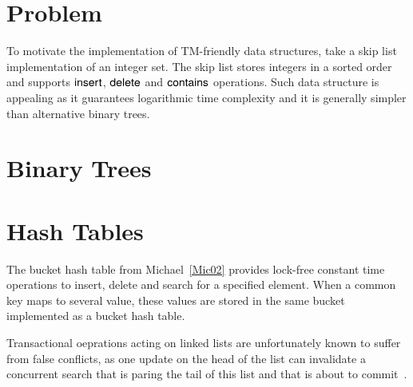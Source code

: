 \documentclass[10pt]{sigplanconf}
\begin{document}
\section{Problem}

To motivate the implementation of TM-friendly data structures, take a skip list implementation of an integer set.
The skip list stores integers in a sorted order and supports $\lit{insert}$, $\lit{delete}$ and $\lit{contains}$ operations.
Such data structure is appealing as it guarantees logarithmic time complexity and it is generally simpler than alternative binary trees.



\section{Binary Trees}

\section{Hash Tables}

The bucket hash table from Michael~\ref{Mic02} provides lock-free constant time operations to insert, 
delete and search for a specified element. When a common key maps to several value, these values are stored
in the same bucket implemented as a bucket hash table. 

Transactional oeprations acting on linked lists are unfortunately known to suffer from false conflicts, 
as one update on the head of the list can invalidate
a concurrent search that is paring the tail of this list and that is about to commit~\cite{FGG09}.
\end{document}
